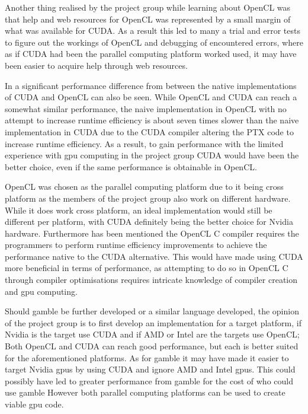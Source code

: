 Another thing realised by the project group while learning about OpenCL was that help and web resources for OpenCL was represented by a small margin of what was available for CUDA.
As a result this led to many a trial and error tests to figure out the workings of OpenCL and debugging of encountered errors, where as if CUDA had been the parallel computing platform worked used, it may have been easier to acquire help through web resources.

In  a significant performance difference from between the native implementations of CUDA and OpenCL can also be seen.
While OpenCL and CUDA can reach a somewhat similar performance, the naive implementation in OpenCL with no attempt to increase runtime efficiency is about seven times slower than the naive implementation in CUDA due to the CUDA compiler altering the \acrshort{PTX} code to increase runtime efficiency.
As a result, to gain performance with the limited experience with \acrshort{gpu} computing in the project group CUDA would have been the better choice, even if the same performance is obtainable in OpenCL.

OpenCL was chosen as the parallel computing platform due to it being cross platform as the members of the project group also work on different hardware.
While it does work cross platform, an ideal implementation would still be different per platform, with CUDA definitely being the better choice for Nvidia hardware.
Furthermore has been mentioned the OpenCL C compiler requires the programmers to perform runtime efficiency improvements to achieve the performance native to the CUDA alternative.
This would have made using CUDA more beneficial in terms of performance, as attempting to do so in OpenCL C through compiler optimisations requires intricate knowledge of compiler creation and \acrshort{gpu} computing.

Should \gls{gamble} be further developed or a similar language developed, the opinion of the project group is to first develop an implementation for a target platform, if Nvidia is the target use CUDA and if AMD or Intel are the targets use OpenCL; Both OpenCL and CUDA can reach good performance, but each is better suited for the aforementioned platforms.
As for \gls{gamble} it may have made it easier to target Nvidia \acrshort{gpu}s by using CUDA and ignore AMD and Intel \acrshort{gpu}s. 
This could possibly have led to greater performance from \acrshort{gamble} for the cost of who could use \gls{gamble}
However both parallel computing platforms can be used to create viable \acrshort{gpu} code.